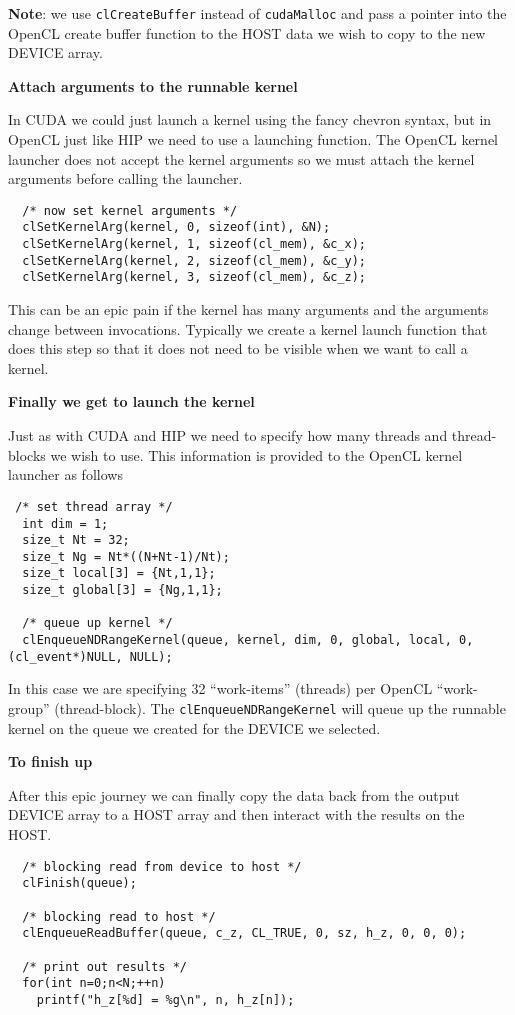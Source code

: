 {\bf Note}: we use \texttt{clCreateBuffer} instead of \texttt{cudaMalloc} and pass a pointer into the OpenCL create buffer function to the HOST data we wish to copy to the new DEVICE array.

{\bf Attach arguments to the runnable kernel}

In CUDA we could just launch a kernel using the fancy chevron syntax, but in OpenCL just like HIP we need to use a launching function. The OpenCL kernel launcher does not accept the kernel arguments so we must attach the kernel arguments before calling the launcher.

\begin{verbatim}
  /* now set kernel arguments */
  clSetKernelArg(kernel, 0, sizeof(int), &N);
  clSetKernelArg(kernel, 1, sizeof(cl_mem), &c_x);
  clSetKernelArg(kernel, 2, sizeof(cl_mem), &c_y);
  clSetKernelArg(kernel, 3, sizeof(cl_mem), &c_z);
\end{verbatim}

This can be an epic pain if the kernel has many arguments and the arguments change between invocations. Typically we create a kernel launch function that does this step so that it does not need to be visible when we want to call a kernel.

{\bf Finally we get to launch the kernel}

Just as with CUDA and HIP we need to specify how many threads and thread-blocks we wish to use. This information is provided to the OpenCL kernel launcher as follows

\begin{verbatim}
 /* set thread array */
  int dim = 1;
  size_t Nt = 32;
  size_t Ng = Nt*((N+Nt-1)/Nt);
  size_t local[3] = {Nt,1,1};
  size_t global[3] = {Ng,1,1};

  /* queue up kernel */
  clEnqueueNDRangeKernel(queue, kernel, dim, 0, global, local, 0, (cl_event*)NULL, NULL);
\end{verbatim}

In this case we are specifying 32 ``work-items'' (threads) per OpenCL ``work-group'' (thread-block). The \texttt{clEnqueueNDRangeKernel} will queue up the runnable kernel on the queue we created for the DEVICE we selected.

{\bf To finish up}

After this epic journey we can finally copy the data back from the output DEVICE array to a HOST array and then interact with the results on the HOST.

\begin{verbatim}
  /* blocking read from device to host */
  clFinish(queue);

  /* blocking read to host */
  clEnqueueReadBuffer(queue, c_z, CL_TRUE, 0, sz, h_z, 0, 0, 0);

  /* print out results */
  for(int n=0;n<N;++n)
    printf("h_z[%d] = %g\n", n, h_z[n]);
\end{verbatim}

